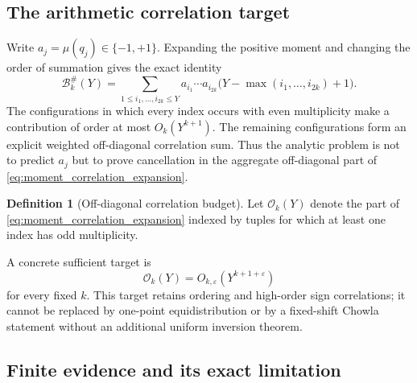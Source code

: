 \documentclass[11pt]{amsart}
\numberwithin{equation}{section}
\theoremstyle{plain}
\theoremstyle{definition}
\newtheorem{definition}[theorem]{Definition}
\theoremstyle{remark}
\newcommand{\Mob}{\mu}
\newcommand{\eps}{\varepsilon}
\begin{document}
\subsection{The arithmetic correlation target}

Write $a_j=\Mob(q_j)\in\{-1,+1\}$.  Expanding the positive moment and changing
the order of summation gives the exact identity
\begin{equation}
\mathcal B_k^{\#}(Y)
=
\sum_{1\leq i_1,\ldots,i_{2k}\leq Y}
a_{i_1}\cdots a_{i_{2k}}
\bigl(Y-\max(i_1,\ldots,i_{2k})+1\bigr).
\label{eq:moment_correlation_expansion}
\end{equation}
The configurations in which every index occurs with even multiplicity make a
contribution of order at most $O_k(Y^{k+1})$.  The remaining configurations
form an explicit weighted off-diagonal correlation sum.  Thus the analytic
problem is not to predict $a_j$ but to prove cancellation in the aggregate
off-diagonal part of \eqref{eq:moment_correlation_expansion}.

\begin{definition}[Off-diagonal correlation budget]
\label{def:off_diagonal_budget}
Let $\mathcal O_k(Y)$ denote the part of
\eqref{eq:moment_correlation_expansion} indexed by tuples for which at least
one index has odd multiplicity.
\end{definition}

A concrete sufficient target is
\begin{equation}
\mathcal O_k(Y)=O_{k,\eps}(Y^{k+1+\eps})
\label{eq:off_diagonal_target}
\end{equation}
for every fixed $k$.  This target retains ordering and high-order sign
correlations; it cannot be replaced by one-point equidistribution or by a
fixed-shift Chowla statement without an additional uniform inversion theorem.

\subsection{Finite evidence and its exact limitation}
\end{document}

